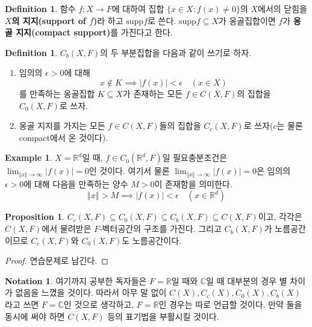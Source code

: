 \documentclass[11pt]{book}
\numberwithin{equation}{chapter}
\def\RR{\mathbb{R}}
\def\CC{\mathbb{C}}
\def\eps{\epsilon}
\newcommand{\abs}[1]{\left\vert#1\right\vert}
\newcommand{\norm}[1]{\left\Vert#1\right\Vert}
\theoremstyle{definition}
\newtheorem{prop}[thm]{Proposition}
\newtheorem{defn}[thm]{Definition}
\newtheorem{notn}[thm]{Notation}
\newtheorem*{ex}{Example}
\newenvironment{enum}
	{\begin{enumerate}[label=(\alph*), leftmargin=2\parindent]}
	{\end{enumerate}}
\begin{document}
\begin{defn}
    함수 \(f : X \to F\)에 대하여 집합 \(\{x \in X : f(x) \ne 0\}\)의 \(X\)에서의 닫힘을 \textbf{\(X\)의 지지(support of \(f\))}라 하고 \(\text{supp} f\)로 쓴다. \(\text{supp} f \subseteq X\)가 옹골집합이면 \(f\)가 \textbf{옹골 지지(compact support)}를 가진다고 한다.
\end{defn}

\begin{defn}
    \(C_b(X, F)\)의 두 부분집합을 다음과 같이 쓰기로 하자.
    \begin{enum}
        \item 임의의 \(\eps > 0\)에 대해
        \[
        x \notin K \implies \abs{f(x)} < \eps \quad (x \in X)    
        \]
        를 만족하는 옹골집합 \(K \subseteq X\)가 존재하는 모든 \(f \in C(X, F)\)의 집합을 \(C_0(X, F)\)로 쓰자.
        \item 옹골 지지를 가지는 모든 \(f \in C(X, F)\)들의 집합을 \(C_c(X, F)\)로 쓰자(\(c\)는 물론 compact에서 온 것이다).
    \end{enum}
\end{defn}

\begin{ex}
    \(X = \RR^d\)일 때, \(f \in C_0(\RR^d, F)\)일 필요충분조건은 \(\lim_{\norm{x} \to \infty} \abs{f(x)} = 0\)인 것이다. 여기서 물론 \(\lim_{\norm{x} \to \infty} \abs{f(x)} = 0\)은 임의의 \(\eps > 0\)에 대해 다음을 만족하는 양수 \(M > 0\)이 존재함을 의미한다.
    \[
    \norm{x} > M \implies \abs{f(x)} < \eps \quad(x \in \RR^d)    
    \]
\end{ex}

\begin{prop} \label{10.4.6}
    \(C_c(X, F) \subseteq C_0(X, F) \subseteq C_b(X, F) \subseteq C(X, F)\)이고, 각각은 \(C(X, F)\)에서 물려받은 \(F\)-벡터공간의 구조를 가진다. 그리고 \(C_b(X, F)\)가 노름공간이므로 \(C_c(X, F)\)와 \(C_0(X, F)\)도 노름공간이다.
\end{prop}
\begin{proof}
    연습문제로 남긴다.
\end{proof}

\begin{notn} \label{10.4.7}
    여기까지 공부한 독자들은 \(F = \RR\)일 때와 \(\CC\)일 때 대부분의 경우 별 차이가 없음을 느꼈을 것이다. 따라서 아무 말 없이 \(C(X), C_c(X), C_0(X), C_b(X)\)라고 쓰면 \(F = \CC\)인 것으로 생각하고, \(F = \RR\)인 경우는 따로 언급할 것이다. 만약 둘을 동시에 써야 하면 \(C(X, F)\) 등의 표기법을 부활시킬 것이다.
\end{notn}
\end{document}
